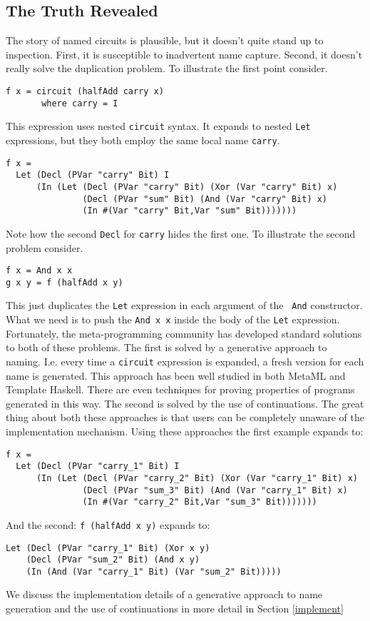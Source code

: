 \documentclass[10pt,twoside]{article}
\begin{document}
\subsection{The Truth Revealed}\label{truth}

The story of named circuits is plausible, but it doesn't quite stand
up to inspection. First, it is susceptible to inadvertent name capture.
Second, it doesn't really solve the duplication problem. To illustrate
the first point consider.
\begin{verbatim}
f x = circuit (halfAdd carry x)
       where carry = I
\end{verbatim}
This expression uses nested {\tt circuit} syntax. It expands to nested
{\tt Let} expressions, but they both employ the same local name {\tt carry}.
\begin{verbatim}
f x = 
  Let (Decl (PVar "carry" Bit) I
      (In (Let (Decl (PVar "carry" Bit) (Xor (Var "carry" Bit) x)
               (Decl (PVar "sum" Bit) (And (Var "carry" Bit) x)
               (In #(Var "carry" Bit,Var "sum" Bit)))))))
\end{verbatim}
Note how the second {\tt Decl} for {\tt carry} hides the first one.
To illustrate the second problem consider.
\begin{verbatim}
f x = And x x
g x y = f (halfAdd x y)
\end{verbatim}

This just duplicates the {\tt Let} expression in each argument of the {\tt
And} constructor. What we need is to push the {\tt And x x} inside the body
of the {\tt Let} expression. Fortunately, the meta-programming community has
developed standard solutions to both of these problems.  The first is solved
by a generative approach to naming. I.e. every time a {\tt circuit}
expression is expanded, a fresh version for each name is generated. This
approach has been well studied in both MetaML\cite{MetaOCaml-paper,TS00,T00} and Template
Haskell\cite{sheard02template}. There are even techniques for proving properties of programs
generated in this way\cite{Taha99}. The second is solved by the use of
continuations. The great thing about both these approaches is that users can
be completely unaware of the implementation mechanism. Using these approaches
the first example expands to:

\begin{verbatim}
f x = 
  Let (Decl (PVar "carry_1" Bit) I
      (In (Let (Decl (PVar "carry_2" Bit) (Xor (Var "carry_1" Bit) x)
               (Decl (PVar "sum_3" Bit) (And (Var "carry_1" Bit) x)
               (In #(Var "carry_2" Bit,Var "sum_3" Bit)))))))
\end{verbatim}
And the second: \verb+f (halfAdd x y)+  expands to:
\begin{verbatim}
Let (Decl (PVar "carry_1" Bit) (Xor x y)
    (Decl (PVar "sum_2" Bit) (And x y)
    (In (And (Var "carry_1" Bit) (Var "sum_2" Bit)))))
\end{verbatim}
We discuss the implementation details of a generative approach to name generation
and the use of continuations in more detail in Section \ref{implement}
\end{document}
